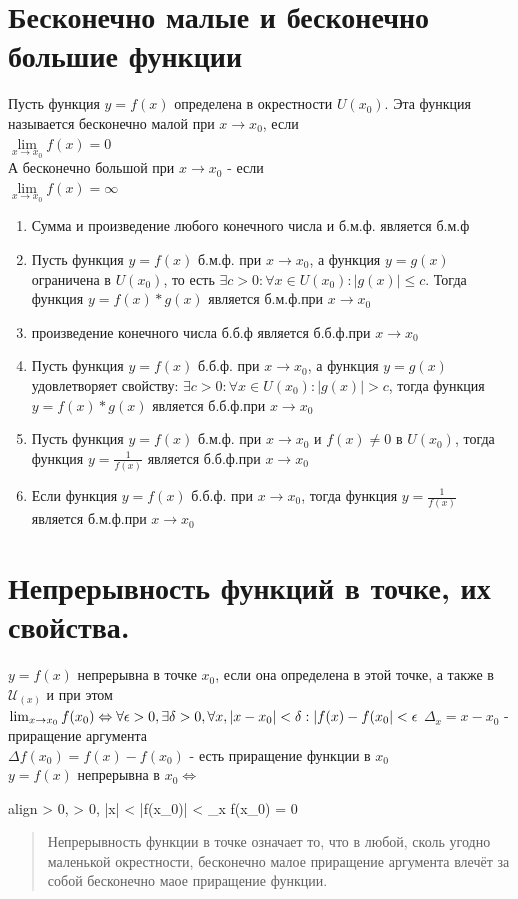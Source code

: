 \documentclass[oneside]{book}
\newcommand{\boxedeq}[2]{\begin{empheq}[box={\fboxsep=6pt\fbox}]{align}\label{#1}#2\end{empheq}}
\begin{document}
\chapter{Бесконечно малые и бесконечно большие функции}
Пусть функция $y = f(x)$ определена в окрестности $U(x_0)$. Эта функция называется бесконечно малой при $x \rightarrow x_0$, если\\ $\lim\limits_{x\rightarrow x_0}f(x)=0$\\
А бесконечно большой при $x \rightarrow x_0$ - если\\ $\lim\limits_{x\rightarrow x_0}f(x)=\infty$
\begin{enumerate}
	\item Сумма и произведение любого конечного числа и б.м.ф. является б.м.ф
	\item Пусть функция $y = f(x)$ б.м.ф. при $x \rightarrow x_0$, а функция $y = g(x)$ ограничена в $U(x_0)$, то есть  $\exists c > 0 : \forall x \in U(x_0): |g(x)|\leq c$. Тогда функция $y=f(x)*g(x)$ является б.м.ф.при $x \rightarrow x_0$
	\item произведение конечного числа б.б.ф является б.б.ф.при $x \rightarrow x_0$
	\item Пусть функция $y = f(x)$ б.б.ф. при $x \rightarrow x_0$, а функция $y = g(x)$ удовлетворяет свойству: $\exists c > 0 : \forall x \in U(x_0): |g(x)| > c$, тогда функция $y=f(x)*g(x)$ является б.б.ф.при $x \rightarrow x_0$
	\item Пусть функция $y = f(x)$ б.м.ф. при $x \rightarrow x_0$ и $f(x) \neq 0$ в $U(x_0)$, тогда функция $y=\frac{1}{f(x)}$ является б.б.ф.при $x \rightarrow x_0$
	\item Если функция $y = f(x)$ б.б.ф. при $x \rightarrow x_0$, тогда функция $y=\frac{1}{f(x)}$ является б.м.ф.при $x \rightarrow x_0$
\end{enumerate}

\setcounter{chapter}{10}
\chapter[Непрерывность]{Непрерывность функций в точке, их свойства.}
$y = f(x)$ непрерывна в точке $x_0$, если она определена в этой точке, а также в $\mathcal{U}_{(x)}$ и при этом
$\lim_{x \rightarrow x_0}{f(x_0) \Leftrightarrow \\ \forall \epsilon > 0, \exists \delta > 0, \forall x, |x - x_0|
< \delta : |f(x) - f(x_0| < \epsilon }$
$\Delta_x = x-x_0$ - приращение аргумента \\
$\Delta f(x_0) = f(x) - f(x_0)$ - есть приращение функции в $x_0$ \\
$y = f(x)$ непрерывна в $x_0 \Leftrightarrow$
\boxedeq{eq:*}{
    \forall \epsilon > 0, \exists \delta > 0, |\Delta x| < \delta \Rightarrow |\Delta f(x_0)|
    < \epsilon \Leftrightarrow \lim_{\Delta x \rightarrow 0}{\Delta f(x_0)} = 0
}
\begin{quote}
    Непрерывность функции в точке означает то, что в любой, сколь угодно маленькой окрестности, бесконечно малое приращение аргумента
    влечёт за собой бесконечно маое приращение функции.
\end{quote}
\end{document}
